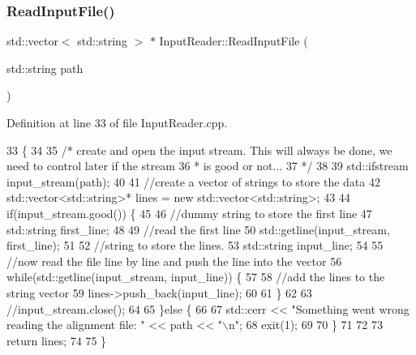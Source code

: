 \subsubsection{\texorpdfstring{Read\+Input\+File()}{ReadInputFile()}}
{\footnotesize\ttfamily std\+::vector$<$ std\+::string $>$ $\ast$ Input\+Reader\+::\+Read\+Input\+File (\begin{DoxyParamCaption}\item[{std\+::string}]{path }\end{DoxyParamCaption})}



Definition at line 33 of file Input\+Reader.\+cpp.


\begin{DoxyCode}
33                                                               \{
34   
35   \textcolor{comment}{/* create and open the input stream. This will always be done, we need to control later if the stream }
36 \textcolor{comment}{   * is good or not...  }
37 \textcolor{comment}{  */}
38   
39   std::ifstream input\_stream(path);
40   
41   \textcolor{comment}{//create a vector of strings to store the data}
42   std::vector<std::string>* lines = \textcolor{keyword}{new} std::vector<std::string>;
43   
44   \textcolor{keywordflow}{if}(input\_stream.good()) \{
45     
46     \textcolor{comment}{//dummy string to store the first line}
47     std::string first\_line;
48   
49     \textcolor{comment}{//read the first line}
50     std::getline(input\_stream, first\_line);
51     
52     \textcolor{comment}{//string to store the lines.}
53     std::string input\_line;
54     
55     \textcolor{comment}{//now read the file line by line and push the line into the vector}
56     \textcolor{keywordflow}{while}(std::getline(input\_stream, input\_line)) \{
57       
58       \textcolor{comment}{//add the lines to the string vector}
59       lines->push\_back(input\_line);
60        
61     \}
62     
63     \textcolor{comment}{//input\_stream.close();}
64     
65   \}\textcolor{keywordflow}{else} \{
66     
67     std::cerr << \textcolor{stringliteral}{"Something went wrong reading the alignment file: "} << path << \textcolor{stringliteral}{"\(\backslash\)n"};
68     exit(1);
69     
70   \}
71   
72   
73   \textcolor{keywordflow}{return} lines;
74   
75 \}
\end{DoxyCode}
\mbox{\label{classInputReader_a7b83b6aef68762bfc59a9958c4768da7}} 
